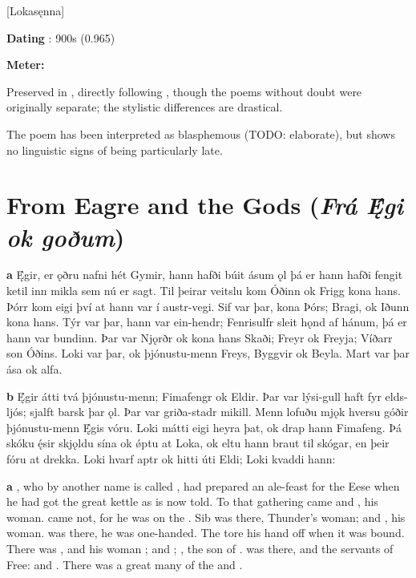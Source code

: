 [Lokasęnna]

\begin{flushright}%
\textbf{Dating} \parencite{Sapp2022}: 900s (0.965)

\textbf{Meter:} \Ljodahattr%
\end{flushright}

Preserved in \Regius, directly following \Hymiskvida, though the poems without doubt were originally separate; the stylistic differences are drastical.

The poem has been interpreted as blasphemous (TODO: elaborate), but shows no linguistic signs of being particularly late.

\sectionline

\section{From Eagre and the Gods (\emph{Frá Ę́gi ok goðum})}

\bpg\bpa \textbf{a} Ę́gir, er ǫðru nafni hét Gymir, hann hafði búit ásum ǫl þá er hann hafði fengit ketil inn mikla sem nú er sagt. Til þeirar veitslu kom Óðinn ok Frigg kona hans. Þórr kom eigi því at hann var í austr-vegi. Sif var þar, kona Þórs; Bragi, ok Iðunn kona hans. Týr var þar, hann var ein-hendr; Fenrisulfr sleit hǫnd af hánum, þá er hann var bundinn. Þar var Njǫrðr ok kona hans Skaði; Freyr ok Freyja; Víðarr son Óðins. Loki var þar, ok þjónustu-menn Freys, Byggvir ok Beyla. Mart var þar ása ok alfa.

\textbf{b} Ę́gir átti tvá þjónustu-menn; Fimafengr ok Eldir. Þar var lýsi-gull haft fyr elds-ljós; sjalft barsk þar ǫl. Þar var griða-stadr mikill. Menn lofuðu mjǫk hversu góðir þjónustu-menn Ę́gis vóru. Loki mátti eigi heyra þat, ok drap hann Fimafeng. Þá skóku ę́sir skjǫldu sína ok ǿptu at Loka, ok eltu hann braut til skógar, en þeir fóru at drekka. Loki hvarf aptr ok hitti úti Eldi; Loki kvaddi hann:\epa

\bpb \textbf{a} , who by another name is called , had prepared an ale-feast for the Eese when he had got the great kettle as is now told. To that gathering came  and , his woman.  came not, for he was on the . Sib was there, Thunder’s woman;  and , his woman.  was there, he was one-handed. The  tore his hand off when it was bound. There was , and his woman ;  and ; , the son of .  was there, and the servants of Free:  and . There was a great many of the  and .

